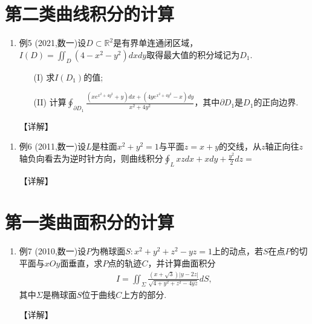 \documentclass[12pt, a4paper, oneside, UTF8]{ctexbook}
\begin{document}
\section{第二类曲线积分的计算}

\begin{remark}
\end{remark}

\begin{enumerate}[label=\arabic*.,start=5]
    \item 例5 (2021,数一)设$D\subset \mathbb{R}^2$是有界单连通闭区域，$I(D)=\iint_D(4-x^2-y^2)dxdy$取得最大值的积分域记为$D_1$.
    \begin{enumerate}
        \item[(I)] 求$I(D_1)$的值;
        \item[(II)] 计算$\oint_{\partial D_1}\frac{(xe^{x^2+4y^2}+y)dx+(4ye^{x^2+4y^2}-x)dy}{x^2+4y^2}$，其中$\partial D_1$是$D_1$的正向边界.
    \end{enumerate}
    
    \begin{solution}
    【详解】
    \end{solution}
\end{enumerate}

\begin{remark}
\end{remark}

\begin{enumerate}[label=\arabic*.,start=6]
    \item 例6 (2011,数一)设$L$是柱面$x^2+y^2=1$与平面$z=x+y$的交线，从$z$轴正向往$z$轴负向看去为逆时针方向，则曲线积分$\oint_L xz dx+xdy+\frac{y^2}{2}dz=$
    
    \begin{solution}
    【详解】
    \end{solution}
\end{enumerate}

\section{第一类曲面积分的计算}

\begin{remark}[方法]
\end{remark}

\begin{enumerate}[label=\arabic*.,start=7]
    \item 例7 (2010,数一)设$P$为椭球面$S:x^2+y^2+z^2-yz=1$上的动点，若$S$在点$P$的切平面与$xOy$面垂直，求$P$点的轨迹$C$，并计算曲面积分
    \begin{align*}
    I=\iint_{\Sigma}\frac{(x+\sqrt{3})|y-2z|}{\sqrt{4+y^2+z^2-4yz}}dS,
    \end{align*}
    其中$\Sigma$是椭球面$S$位于曲线$C$上方的部分.
    
    \begin{solution}
    【详解】
    \end{solution}
\end{enumerate}
\end{document}

